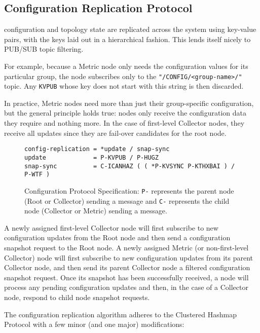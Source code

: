 \subsection{Configuration Replication Protocol}
\label{proto_config}

\dcamp configuration and topology state are replicated across the system using key-value pairs, with the keys laid out
in a hierarchical fashion. This lends itself nicely to PUB/SUB topic filtering.

For example, because a Metric node only needs the configuration values for its particular group, the node subscribes
only to the \texttt{"/CONFIG/<group-name>/"} topic. Any \texttt{KVPUB} whose key does not start with this string is
then discarded.

In practice, Metric nodes need more than just their group-specific configuration, but the general principle holds true:
nodes only receive the configuration data they require and nothing more. In the case of first-level Collector nodes, they
receive all updates since they are fail-over candidates for the root node.

\begin{figure}[H]
\vspace{+10pt}
\begin{verbatim}
config-replication = *update / snap-sync
update             = P-KVPUB / P-HUGZ
snap-sync          = C-ICANHAZ ( ( *P-KVSYNC P-KTHXBAI ) / P-WTF )
\end{verbatim}
\vspace{-5pt}
\caption[Configuration Protocol Specification]
	{Configuration Protocol Specification: \texttt{P-} represents the parent node (Root or Collector) sending a
	 message and \texttt{C-} represents the child node (Collector or Metric) sending a message.}
\label{fig:proto_config_spec}
\end{figure}

A newly assigned first-level Collector node will first subscribe to new configuration updates from the Root node and
then send a configuration snapshot request to the Root node. A newly assigned Metric (or non-first-level Collector) node
will first subscribe to new configuration updates from its parent Collector node, and then send its parent Collector
node a filtered configuration snapshot request. Once its snapshot has been successfully received, a node will process
any pending configuration updates and then, in the case of a Collector node, respond to child node snapshot requests.

The \dcamp configuration replication algorithm adheres to the Clustered Hashmap Protocol\cite{chp} with a few minor
(and one major) modifications:

